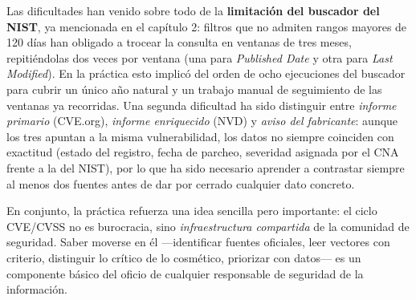 Las dificultades han venido sobre todo de la \textbf{limitación del buscador del NIST}, ya mencionada en el capítulo 2: filtros que no admiten rangos mayores de 120 días han obligado a trocear la consulta en ventanas de tres meses, repitiéndolas dos veces por ventana (una para \textit{Published Date} y otra para \textit{Last Modified}). En la práctica esto implicó del orden de ocho ejecuciones del buscador para cubrir un único año natural y un trabajo manual de seguimiento de las ventanas ya recorridas. Una segunda dificultad ha sido distinguir entre \textit{informe primario} (CVE.org), \textit{informe enriquecido} (NVD) y \textit{aviso del fabricante}: aunque los tres apuntan a la misma vulnerabilidad, los datos no siempre coinciden con exactitud (estado del registro, fecha de parcheo, severidad asignada por el CNA frente a la del NIST), por lo que ha sido necesario aprender a contrastar siempre al menos dos fuentes antes de dar por cerrado cualquier dato concreto.

En conjunto, la práctica refuerza una idea sencilla pero importante: el ciclo CVE/CVSS no es burocracia, sino \textit{infraestructura compartida} de la comunidad de seguridad. Saber moverse en él ---identificar fuentes oficiales, leer vectores con criterio, distinguir lo crítico de lo cosmético, priorizar con datos--- es un componente básico del oficio de cualquier responsable de seguridad de la información.
